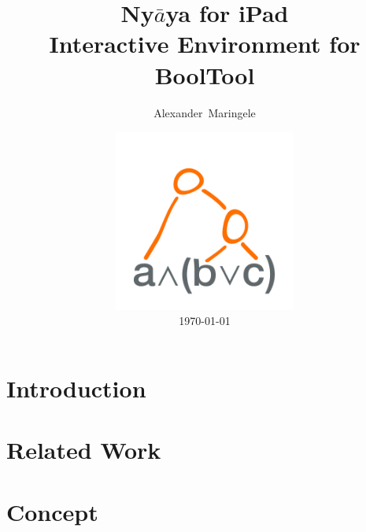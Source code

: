 \documentclass{clbthesis}
\begin{document}

\title{Ny$\bar{a}$ya for iPad\vspace{0.5cm}\\ \LARGE{Interactive Environment for BoolTool}}
\author{Alexander~Maringele}
\date{\includegraphics[width=6cm]{pics/NyayaAppIcon1024.png}\\ \today}


\maketitle

\abstract{}

\tableofcontents
\chapter{Introduction} 			


\chapter{Related Work}						


\chapter{Concept}	
\label{ch:concept}						

\end{document}
